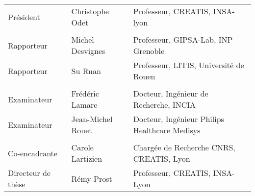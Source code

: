 \begin{titlepage}
\begin{center}

\begin{tabular}{l l l}
Président	& Christophe Odet	&	Professeur, CREATIS, INSA-lyon\\
\\
Rapporteur 	& Michel Desvignes	&	Professeur, GIPSA-Lab, INP Grenoble\\
Rapporteur 	& Su Ruan		&	Professeur, LITIS, Université de Rouen\\
\\
Examinateur	& Frédéric Lamare	&	Docteur, Ingénieur de Recherche, INCIA\\
Examinateur	& Jean-Michel Rouet	&	Docteur, Ingénieur Philips Healthcare Medisys\\
\\
Co-encadrante	& Carole Lartizien	&	Chargée de Recherche CNRS, CREATIS, Lyon\\
Directeur de thèse& Rémy Prost		&	Professeur, CREATIS, INSA-Lyon\\




% 
\end{tabular}



\end{center}

\end{titlepage}